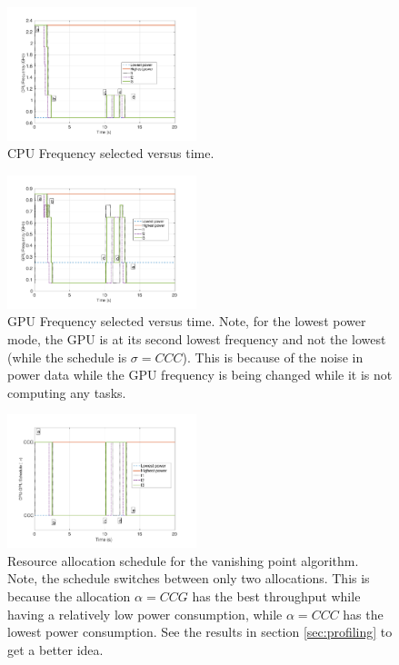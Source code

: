  
\begin{figure}[t]
\centering
\includegraphics[width=0.49\textwidth]{../simulations/figs/CPUF.pdf}
\vspace{-20pt}
\caption{CPU Frequency selected versus time.}
\label{fig:cpuf} 
\end{figure}


\begin{figure}[t]
\centering
\includegraphics[width=0.49\textwidth]{../simulations/figs/GPUF.pdf}
\vspace{-20pt}
\caption{GPU Frequency selected versus time. Note, for the lowest power mode, the GPU is at its second lowest frequency and not the lowest (while the schedule is $\sigma=CCC$). This is because of the noise in power data while the GPU frequency is being changed while it is not computing any tasks.}
\label{fig:gpuf} 
\end{figure}


\begin{figure}[t]
\centering
\includegraphics[width=0.49\textwidth]{../simulations/figs/schedule.pdf}
\vspace{-20pt}
\caption{Resource allocation schedule for the vanishing point algorithm. Note, the schedule switches between only two allocations. This is because the allocation $\alpha=CCG$ has the best throughput while having a relatively low power consumption, while $\alpha=CCC$ has the lowest power consumption. See the results in section \ref{sec:profiling} to get a better idea.}
\label{fig:schedule} 
\end{figure}

